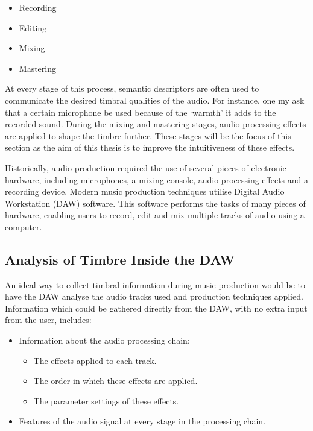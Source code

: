 		\begin{itemize}
			\item Recording
			\item Editing
			\item Mixing
			\item Mastering
		\end{itemize}

		At every stage of this process, semantic descriptors are often used to communicate the desired timbral
		qualities of the audio. For instance, one my ask that a certain microphone be used because of the `warmth'
		it adds to the recorded sound. During the mixing and mastering stages, audio processing effects are applied
		to shape the timbre further. These stages will be the focus of this section as the aim of this thesis is
		to improve the intuitiveness of these effects.

		Historically, audio production required the use of several pieces of electronic hardware, including
		microphones, a mixing console, audio processing effects and a recording device. Modern music production
		techniques utilise Digital Audio Workstation (DAW) software. This software performs the tasks of many
		pieces of hardware, enabling users to record, edit and mix multiple tracks of audio using a computer. 
		
	\subsection{Analysis of Timbre Inside the DAW}
	\label{sec:TimbreEvaluation-DAWBasedTimbreEvaluation-InDAW}
		An ideal way to collect timbral information during music production would be to have the DAW analyse the
		audio tracks used and production techniques applied. Information which could be gathered directly from the
		DAW, with no extra input from the user, includes:

		\begin{itemize}
			\item Information about the audio processing chain:
			\begin{itemize}
				\item The effects applied to each track.
				\item The order in which these effects are applied.
				\item The parameter settings of these effects.
			\end{itemize}
			\item Features of the audio signal at every stage in the processing chain.
		\end{itemize}

